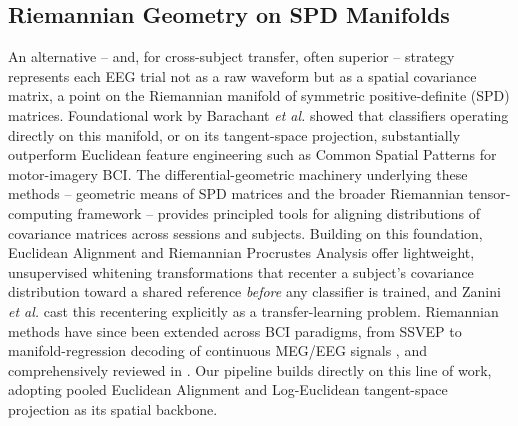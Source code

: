 \documentclass[journal]{IEEEtran}
\begin{document}
\subsection{Riemannian Geometry on SPD Manifolds}
An alternative -- and, for cross-subject transfer, often superior -- strategy represents each EEG trial not as a raw waveform but as a spatial covariance matrix, a point on the Riemannian manifold of symmetric positive-definite (SPD) matrices. Foundational work by Barachant \emph{et al.} \cite{barachant2012multiclass,barachant2013classification} showed that classifiers operating directly on this manifold, or on its tangent-space projection, substantially outperform Euclidean feature engineering such as Common Spatial Patterns \cite{blankertz2008optimizing,ang2008filter,grossewentrup2008multiclass} for motor-imagery BCI. The differential-geometric machinery underlying these methods -- geometric means of SPD matrices \cite{moakher2005differential} and the broader Riemannian tensor-computing framework \cite{pennec2006riemannian} -- provides principled tools for aligning distributions of covariance matrices across sessions and subjects. Building on this foundation, Euclidean Alignment \cite{he2020transfer} and Riemannian Procrustes Analysis \cite{rodrigues2019riemannian} offer lightweight, unsupervised whitening transformations that recenter a subject's covariance distribution toward a shared reference \emph{before} any classifier is trained, and Zanini \emph{et al.} \cite{zanini2018transfer} cast this recentering explicitly as a transfer-learning problem. Riemannian methods have since been extended across BCI paradigms, from SSVEP \cite{kalunga2016online} to manifold-regression decoding of continuous MEG/EEG signals \cite{sabbagh2019manifold}, and comprehensively reviewed in \cite{congedo2017riemannian,yger2017review}. Our pipeline builds directly on this line of work, adopting pooled Euclidean Alignment and Log-Euclidean tangent-space projection as its spatial backbone.
\end{document}
